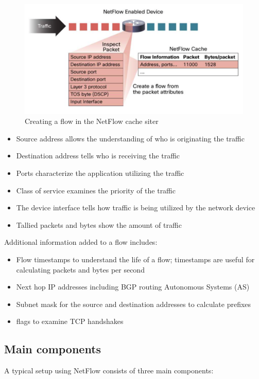 \begin{figure}[h!]
\includegraphics[scale=0.2]{netflow_cache}
\caption{Creating a flow in the NetFlow cache siter}
\end{figure}

\begin{itemize}
\item Source address allows the understanding of who is originating the traffic
\item Destination address tells who is receiving the traffic
\item Ports characterize the application utilizing the traffic
\item Class of service examines the priority of the traffic
\item The device interface tells how traffic is being utilized by the network device
\item Tallied packets and bytes show the amount of traffic
\end{itemize}

Additional information added to a flow includes:
\begin{itemize}


\item Flow timestamps to understand the life of a flow; timestamps are useful for calculating packets and bytes per second
\item Next hop IP addresses including BGP routing Autonomous Systems (AS)
\item Subnet mask for the source and destination addresses to calculate prefixes
 \item  flags to examine TCP handshakes

\end{itemize}


\subsection{Main components}
A typical setup using NetFlow consists of three main components:

